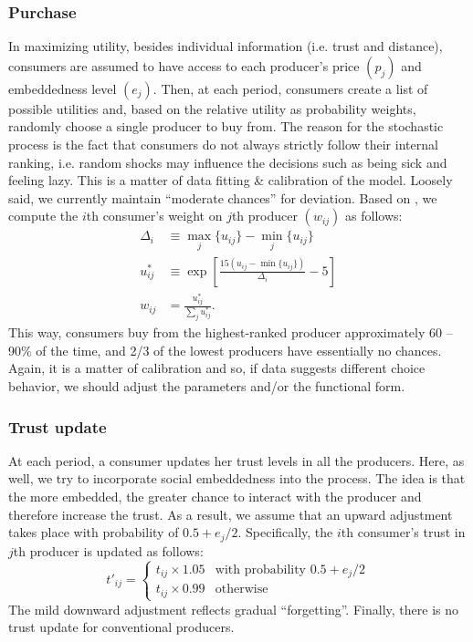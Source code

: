 \documentclass[11pt, oneside]{article}
\begin{document}
\subsubsection{Purchase}
In maximizing utility, besides individual information (i.e. trust and distance), consumers are assumed to have access to each producer's price $(p_j)$ and embeddedness level $(e_j)$. Then, at each period, consumers create a list of possible utilities and, based on the relative utility as probability weights, randomly choose a single producer to buy from. The reason for the stochastic process is the fact that consumers do not always strictly follow their internal ranking, i.e. random shocks may influence the decisions such as being sick and feeling lazy. This is a matter of data fitting \& calibration of the model. Loosely said, we currently maintain ``moderate chances'' for deviation. Based on \textcite{Walter2008}, we compute the $i$th consumer's weight on $j$th producer $(w_{ij})$ as follows:
\begin{align*}
  \Delta_i &\equiv \max_j\{u_{ij}\} - \min_j\{u_{ij}\} \\
  u^*_{ij} &\equiv \exp \left[\frac{15(u_{ij} - \min\{u_{ij}\})}{\Delta_i} - 5 \right] \\
  w_{ij} &= \frac{u^*_{ij}}{\sum_j u^*_{ij}} .
\end{align*}
This way, consumers buy from the highest-ranked producer approximately 60 -- 90\% of the time, and 2/3 of the lowest producers have essentially no chances. Again, it is a matter of calibration and so, if data suggests different choice behavior, we should adjust the parameters and/or the functional form.

\subsubsection{Trust update}
At each period, a consumer updates her trust levels in all the producers. Here, as well, we try to incorporate social embeddedness into the process. The idea is that the more embedded, the greater chance to interact with the producer and therefore increase the trust. As a result, we assume that an upward adjustment takes place with probability of $0.5 + e_j \slash 2$. Specifically, the $i$th consumer's trust in $j$th producer is updated as follows:
\begin{displaymath}
t'_{ij} =
\begin{cases}
t_{ij} \times 1.05 & \text{with probability } 0.5 + e_j \slash 2\\
t_{ij} \times 0.99 & \text{otherwise}
\end{cases}
\end{displaymath}
The mild downward adjustment reflects gradual ``forgetting''. Finally, there is no trust update for conventional producers.
\end{document}
